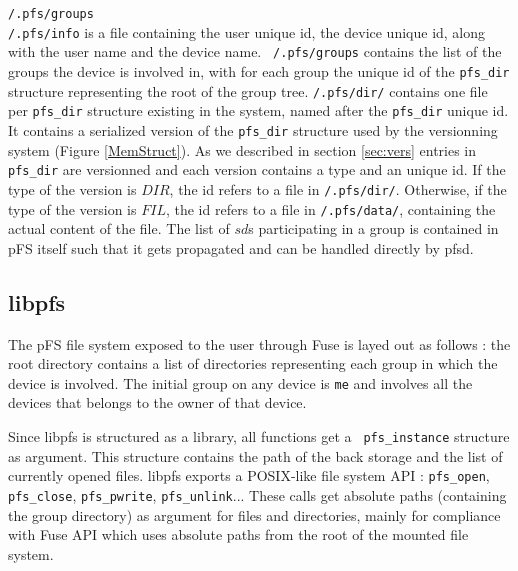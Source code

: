 {\tt /.pfs/groups} \\

{\tt /.pfs/info} is a file containing the user unique id, the device
unique id, along with the user name and the device name. {\tt
  /.pfs/groups} contains the list of the groups the device is involved
in, with for each group the unique id of the {\tt pfs\_dir} structure
representing the root of the group tree. {\tt /.pfs/dir/} contains one
file per {\tt pfs\_dir} structure existing in the system, named after
the {\tt pfs\_dir} unique id. It contains a serialized version of the
{\tt pfs\_dir} structure used by the versionning system (Figure
\ref{MemStruct}). As we described in section \ref{sec:vers}
entries in {\tt pfs\_dir} are versionned and each version contains a
type and an unique id. If the type of the version is $DIR$, the id
refers to a file in {\tt /.pfs/dir/}. Otherwise, if the type of the
version is $FIL$, the id refers to a file in {\tt /.pfs/data/},
containing the actual content of the file. The list of $sd$s
participating in a group is contained in pFS itself such that it gets
propagated and can be handled directly by pfsd.

\subsection {libpfs}

The pFS file system exposed to the user through Fuse is layed out as
follows : the root directory contains a list of directories
representing each group in which the device is involved. The initial
group on any device is {\tt me} and involves all the devices that
belongs to the owner of that device.

Since libpfs is structured as a library, all functions get a {\tt
  pfs\_instance} structure as argument. This structure contains the path
of the back storage and the list of currently opened files. libpfs
exports a POSIX-like file system API : {\tt pfs\_open}, {\tt
  pfs\_close}, {\tt pfs\_pwrite}, {\tt pfs\_unlink}... These calls get
absolute paths (containing the group directory) as argument for files
and directories, mainly for compliance with Fuse API
which uses absolute paths from the root of the mounted file system.

